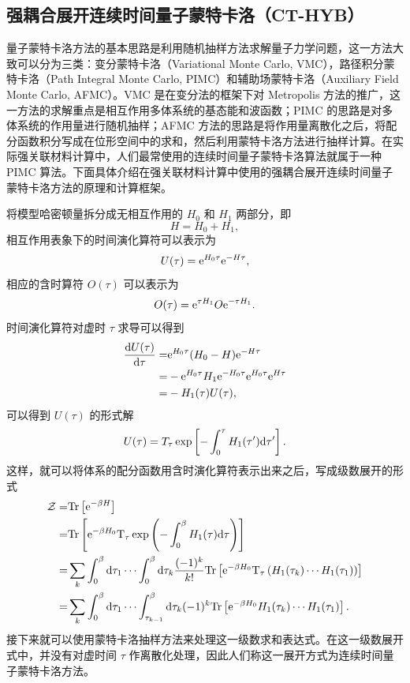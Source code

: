 \subsection{强耦合展开连续时间量子蒙特卡洛（CT-HYB）}
量子蒙特卡洛方法的基本思路是利用随机抽样方法求解量子力学问题，这一方法大致可以分为三类：变分蒙特卡洛（Variational Monte Carlo, VMC），路径积分蒙特卡洛（Path Integral Monte Carlo, PIMC）和辅助场蒙特卡洛（Auxiliary Field Monte Carlo, AFMC）。VMC 是在变分法的框架下对 Metropolis 方法的推广，这一方法的求解重点是相互作用多体系统的基态能和波函数；PIMC 的思路是对多体系统的作用量进行随机抽样；AFMC 方法的思路是将作用量离散化之后，将配分函数积分写成在位形空间中的求和，然后利用蒙特卡洛方法进行抽样计算。在实际强关联材料计算中，人们最常使用的连续时间量子蒙特卡洛算法就属于一种 PIMC 算法。下面具体介绍在强关联材料计算中使用的强耦合展开连续时间量子蒙特卡洛方法的原理和计算框架。

将模型哈密顿量拆分成无相互作用的 $H_0$ 和 $H_1$ 两部分，即
\begin{equation}
    H=H_0+H_1,
\end{equation}
相互作用表象下的时间演化算符可以表示为
\begin{equation}
    U(\tau)=\mathrm{e}^{H_0\tau}\mathrm{e}^{-H\tau},
\end{equation}
相应的含时算符 $O(\tau)$ 可以表示为
\begin{equation}
    O(\tau)=\mathrm{e}^{\tau H_1}O\mathrm{e}^{-\tau H_1}.
\end{equation}
时间演化算符对虚时 $\tau$ 求导可以得到 
\begin{equation}
    \begin{aligned}
        \frac{\mathrm{d} U(\tau)}{\mathrm{d}\tau}=& \mathrm{e}^{H_0\tau}(H_0-H)\mathrm{e}^{-H\tau}\\
        =& -\mathrm{e}^{H_0\tau} H_1 \mathrm{e}^{-H_0\tau}\mathrm{e}^{H_0\tau}\mathrm{e}^{H\tau}\\
        =&-H_1(\tau)U(\tau),
    \end{aligned}
\end{equation}
可以得到 $U(\tau)$ 的形式解 
\begin{equation}
    U(\tau)=T_{\tau}\exp\left[ -\int_0^{\tau}H_1(\tau')\mathrm{d}\tau' \right].
\end{equation}
这样，就可以将体系的配分函数用含时演化算符表示出来之后，写成级数展开的形式
\begin{equation}
    \begin{aligned}
        \mathcal{Z}=&\mathrm{Tr}\left[ \mathrm{e}^{-\beta H} \right]\\
        =& \mathrm{Tr}\left[ \mathrm{e}^{-\beta H_0}\mathrm{T}_{\tau}\exp\left( -\int_0^\beta H_1(\tau)\mathrm{d}\tau \right) \right]\\
        =& \sum_k\int_0^\beta \mathrm{d}\tau_1\cdots\int_0^\beta \mathrm{d}\tau_k\frac{(-1)^k}{k!}\mathrm{Tr}\left[ \mathrm{e}^{-\beta H_0}\mathrm{T}_{\tau}\left( H_1(\tau_k)\cdots H_1(\tau_1) \right) \right]\\
        =& \sum_k\int_0^\beta \mathrm{d}\tau_1\cdots \int_{\tau_{k-1}}^\beta \mathrm{d}\tau_{k}(-1)^k \mathrm{Tr}\left[ \mathrm{e}^{-\beta H_0}H_1(\tau_k)\cdots H_1(\tau_1) \right].
    \end{aligned}\label{cthyb-Z}
\end{equation}
接下来就可以使用蒙特卡洛抽样方法来处理这一级数求和表达式。在这一级数展开式中，并没有对虚时间 $\tau$ 作离散化处理，因此人们称这一展开方式为连续时间量子蒙特卡洛方法。

